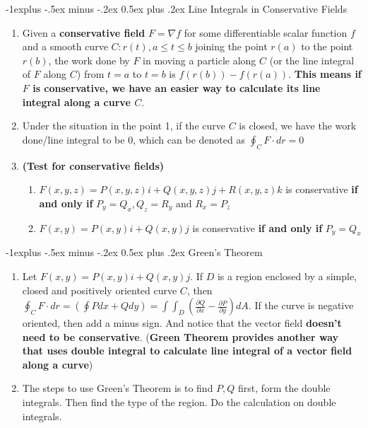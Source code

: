 \documentclass[10pt, landscape]{article}
\makeatletter
\renewcommand{\subsection}{\@startsection{subsection}{2}{0mm}%
                                {-1explus -.5ex minus -.2ex}%
                                {0.5ex plus .2ex}%
                                {\normalfont\normalsize\bfseries}}
\makeatother
\begin{document}
\begin{multicols}{4}
\subsection{Line Integrals in Conservative Fields}
\begin{enumerate}
    \item Given a \textbf{conservative field} $F=\nabla f$ for some differentiable scalar function $f$ and a smooth curve $C: r(t), a\leq t\leq b$ joining the point $r(a)$ to the point $r(b)$, the work done by $F$ in moving a particle along $C$ (or the line integral of $F$ along $C$) from $t=a$ to $t=b$ is $f(r(b))-f(r(a))$. \textbf{This means if $F$ is conservative, we have an easier way to calculate its line integral along a curve $C$}.
    \item Under the situation in the point 1, if the curve $C$ is closed, we have the work done/line integral to be $0$, which can be denoted as $\oint_CF\cdot dr=0$
    \item \textbf{(Test for conservative fields)}
    \begin{enumerate}
        \item $F(x,y,z)=P(x,y,z)i+Q(x,y,z)j+R(x,y,z)k$ is conservative \textbf{if and only if} $P_y=Q_x, Q_z=R_y\text{ and }R_x=P_z$
        \item $F(x,y)=P(x,y)i+Q(x,y)j$ is conservative \textbf{if and only if} $P_y=Q_x$
    \end{enumerate}
\end{enumerate}

\subsection{Green's Theorem}
\begin{enumerate}
    \item Let $F(x,y)=P(x,y)i+Q(x,y)j$. If $D$ is a region enclosed by a simple, closed and positively oriented curve $C$, then $\oint_CF\cdot dr=(\oint Pdx+Qdy)=\int\int_D(\frac{\partial Q}{\partial x}-\frac{\partial P}{\partial y})dA$. If the curve is negative oriented, then add a minus sign. And notice that the vector field \textbf{doesn't need to be conservative}. (\textbf{Green Theorem provides another way that uses double integral to calculate line integral of a vector field along a curve})
    \item The steps to use Green's Theorem is to find $P, Q$ first, form the double integrals. Then find the type of the region. Do the calculation on double integrals.
\end{enumerate}


\end{multicols}
\end{document}
